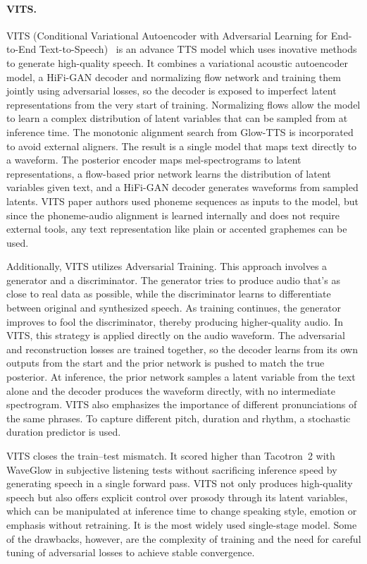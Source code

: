 \documentclass[
         english, %
    monochrome, %
]{VUMIFSEMasterThesis}
\begin{document}
\paragraph{VITS.}
VITS (Conditional Variational Autoencoder with Adversarial Learning for End-to-End Text-to-Speech)~\cite{kim2021conditional} is an advance TTS model which uses inovative methods to generate high-quality speech.
It combines a variational acoustic autoencoder model, a HiFi-GAN decoder and normalizing flow network and training them jointly using adversarial losses, so the decoder is exposed to imperfect latent representations from the very start of training.
Normalizing flows allow the model to learn a complex distribution of latent variables that can be sampled from at inference time.
The monotonic alignment search from Glow-TTS is incorporated to avoid external aligners.
The result is a single model that maps text directly to a waveform.
The posterior encoder maps mel-spectrograms to latent representations, a flow-based prior network learns the distribution of latent variables given text, and a HiFi-GAN decoder generates waveforms from sampled latents.
VITS paper authors used phoneme sequences as inputs to the model, but since the phoneme-audio alignment is learned internally and does not require external tools, any text representation like plain or accented graphemes can be used.

Additionally, VITS utilizes Adversarial Training.
This approach involves a generator and a discriminator.
The generator tries to produce audio that's as close to real data as possible, while the discriminator learns to differentiate between original and synthesized speech.
As training continues, the generator improves to fool the discriminator, thereby producing higher-quality audio.
In VITS, this strategy is applied directly on the audio waveform.
The adversarial and reconstruction losses are trained together, so the decoder learns from its own outputs from the start and the prior network is pushed to match the true posterior.
At inference, the prior network samples a latent variable from the text alone and the decoder produces the waveform directly, with no intermediate spectrogram.
VITS also emphasizes the importance of different pronunciations of the same phrases.
To capture different pitch, duration and rhythm, a stochastic duration predictor is used.

VITS closes the train--test mismatch.
It scored higher than Tacotron~2 with WaveGlow in subjective listening tests without sacrificing inference speed by generating speech in a single forward pass.
VITS not only produces high-quality speech but also offers explicit control over prosody through its latent variables, which can be manipulated at inference time to change speaking style, emotion or emphasis without retraining.
It is the most widely used single-stage model.
Some of the drawbacks, however, are the complexity of training and the need for careful tuning of adversarial losses to achieve stable convergence.
\end{document}
